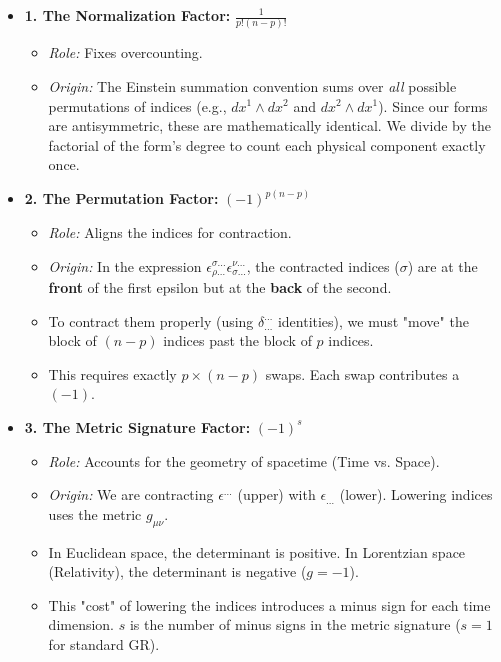 \documentclass[11pt, a4paper]{report}
\begin{document}
\begin{itemize}
    \item \textbf{1. The Normalization Factor:} $\frac{1}{p!(n-p)!}$
    \begin{itemize}
        \item \textit{Role:} Fixes overcounting.
        \item \textit{Origin:} The Einstein summation convention sums over \textit{all} possible permutations of indices (e.g., $dx^1 \wedge dx^2$ and $dx^2 \wedge dx^1$). Since our forms are antisymmetric, these are mathematically identical. We divide by the factorial of the form's degree to count each physical component exactly once.
    \end{itemize}

    \item \textbf{2. The Permutation Factor:} $(-1)^{p(n-p)}$
    \begin{itemize}
        \item \textit{Role:} Aligns the indices for contraction.
        \item \textit{Origin:} In the expression $\epsilon^{\sigma \dots}_{\rho \dots} \epsilon^{\nu \dots}_{\sigma \dots}$, the contracted indices ($\sigma$) are at the \textbf{front} of the first epsilon but at the \textbf{back} of the second.
        \item To contract them properly (using $\delta^{\dots}_{\dots}$ identities), we must "move" the block of $(n-p)$ indices past the block of $p$ indices.
        \item This requires exactly $p \times (n-p)$ swaps. Each swap contributes a $(-1)$.
    \end{itemize}

    \item \textbf{3. The Metric Signature Factor:} $(-1)^s$
    \begin{itemize}
        \item \textit{Role:} Accounts for the geometry of spacetime (Time vs. Space).
        \item \textit{Origin:} We are contracting $\epsilon^{\dots}$ (upper) with $\epsilon_{\dots}$ (lower). Lowering indices uses the metric $g_{\mu\nu}$.
        \item In Euclidean space, the determinant is positive. In Lorentzian space (Relativity), the determinant is negative ($g = -1$).
        \item This "cost" of lowering the indices introduces a minus sign for each time dimension. $s$ is the number of minus signs in the metric signature ($s=1$ for standard GR).
    \end{itemize}
\end{itemize}
\end{document}
